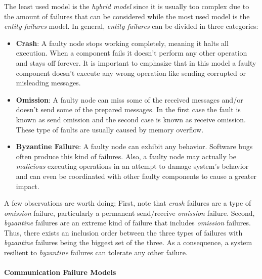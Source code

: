 \documentclass[..]{subfiles}
\begin{document}
The least used model is the \textit{hybrid model} since it is usually too complex due to the amount of failures that can be considered while the most used model is the \textit{entity failures} model. In general, \textit{entity failures} can be divided in three categories:
\begin{itemize}
	\item \textbf{Crash}: A faulty node stops working completely, meaning it halts all execution. When a component fails it doesn't perform any other operation and stays off forever. It is important to emphasize that in this model a faulty component doesn't execute any wrong operation like sending corrupted or misleading messages.
	\item \textbf{Omission}: A faulty node can miss some of the received messages and/or doesn't send some of the prepared messages. In the first case the fault is known as send omission and the second case is known as receive omission. These type of faults are usually caused by memory overflow.
	\item \textbf{Byzantine Failure}: A faulty node can exhibit any behavior. Software bugs often produce this kind of failures. Also, a faulty node may actually be \textit{malicious} executing operations in an attempt to damage system's behavior and can even be coordinated with other faulty components to cause a greater impact.
\end{itemize}
A few observations are worth doing; First, note that \textit{crash} failures are a type of \textit{omission} failure, particularly a permanent send/receive \textit{omission} failure. Second, 
\textit{byzantine} failures are an extreme kind of failure that includes \textit{omission} failures. Thus, there exists an inclusion order between the three types of failures with \textit{byzantine} failures being the biggest set of the three. As a consequence, a system resilient to \textit{byzantine} failures can tolerate any other failure.

\paragraph{Communication Failure Models}
\end{document}
